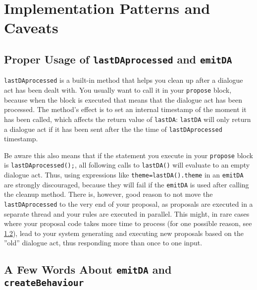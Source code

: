 \section{Implementation Patterns and Caveats}

\subsection{Proper Usage of \texttt{lastDAprocessed} and \texttt{emitDA}}

\texttt{lastDAprocessed} is a built-in method that helps you clean up after a dialogue act has been dealt with. You usually want to call it in your \texttt{propose} block, because when the block is executed that means that the dialogue act has been processed. The method's effect is to set an internal timestamp of the moment it has been called, which affects the return value of \texttt{lastDA}: \texttt{lastDA} will only return a dialogue act if it has been sent after the the time of \texttt{lastDAprocessed} timestamp.

Be aware this also means that if the statement you execute in your \texttt{propose} block is \texttt{lastDAprocessed();}, all following calls to \texttt{lastDA()} will evaluate to an empty dialogue act. Thus, using expressions like \texttt{theme=lastDA().theme} in an \texttt{emitDA} are strongly discouraged, because they will fail if the \texttt{emitDA} is used after calling the cleanup method. There is, however, good reason to not move the \texttt{lastDAprocessed} to the very end of your proposal, as proposals are executed in a separate thread and your 
\vonda rules are executed in parallel. This might, in rare cases where your proposal code takes more time to process (for one possible reason, see \ref{emitDA}), lead to your system generating and executing new proposals based on the ''old'' dialogue act, thus responding more than once to one input.

\subsection{A Few Words About \texttt{emitDA} and \texttt{createBehaviour}} \label{emitDA}